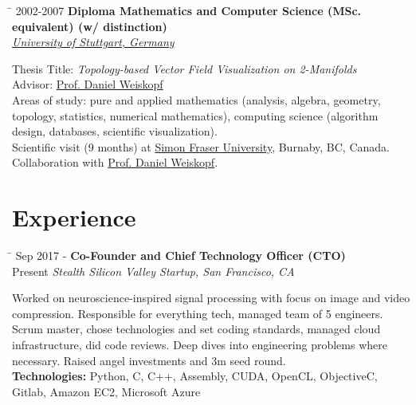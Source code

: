 \documentclass[10pt]{article} %
\newlength{\marginwidth}
\newlength{\smallertextwidth}
\newcommand{\education}[4]{
\begin{tabbing}%
\hspace{\marginwidth}\=\kill%
{#1} \> \textbf{#2}\\
\>\+ \textit{#3}\\[5pt]
\begin{minipage}{\smallertextwidth}
\vspace{2mm}
#4
\end{minipage}
\end{tabbing}
\vspace{2mm}
}
\newcommand{\job}[5]{
\begin{tabbing}
\hspace{\marginwidth} \= \kill
{#1} \> \textbf{#3}\\
{#2} \>\+ \textit{#4}\\[5pt]
\begin{minipage}{\smallertextwidth}
\vspace{2mm}
#5
\end{minipage}
\end{tabbing}
\vspace{2mm}
}
\begin{document}
\education
{2002-2007}
{Diploma Mathematics and Computer Science (MSc. equivalent) \textmd{(w/ distinction)}}
{\href{https://uni-stuttgart.de}{University of Stuttgart, Germany}}
{
Thesis Title: \textit{Topology-based Vector Field Visualization on 2-Manifolds}\\
Advisor: \href{https://www.vis.uni-stuttgart.de/institut/mitarbeiter/Weiskopf-00001/}{Prof. Daniel Weiskopf}\\[5pt]
%
Areas of study: pure and applied mathematics (analysis, algebra, geometry, topology, statistics, numerical mathematics), 
computing science (algorithm design, databases, scientific visualization).\\
Scientific visit (9 months) at \href{https://www.sfu.ca/}{Simon Fraser University}, Burnaby, BC, Canada.
Collaboration with \href{https://www.vis.uni-stuttgart.de/institut/mitarbeiter/Weiskopf-00001/}{Prof. Daniel Weiskopf}.
}



\section{Experience}

\job
{Sep 2017 -}{Present}
{Co-Founder and Chief Technology Officer (CTO)}
{Stealth Silicon Valley Startup\textup{, San Francisco, CA}}
{
Worked on neuroscience-inspired signal processing with focus on image and video compression. 
Responsible for everything tech, managed team of 5 engineers. Scrum master, chose technologies and
set coding standards, managed cloud infrastructure, did code reviews. Deep dives into engineering
problems where necessary. Raised angel investments and 3m seed round.\\[5pt]
\textbf{Technologies:} Python, C, C++, Assembly, CUDA, OpenCL, ObjectiveC, Gitlab, Amazon EC2, Microsoft Azure
}
\end{document}

